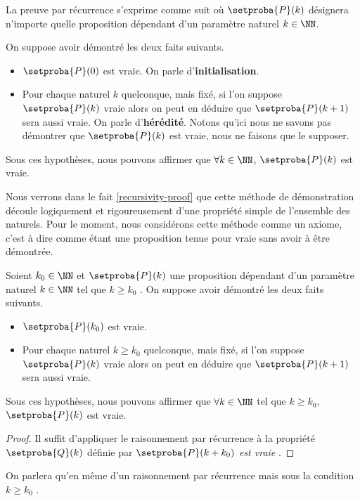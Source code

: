 \begin{fact} \label{recursivity}
	La preuve par récurrence s'exprime comme suit où $\setproba{P}(k)$ désignera n'importe quelle proposition dépendant d'un paramètre naturel $k \in \NN$.

	\medskip

	On suppose avoir démontré les deux faits suivants.
	
	\begin{itemize}[label=\small\textbullet]
		\item $\setproba{P}(0)$ est vraie. On parle d'\textbf{initialisation}.

		\item Pour chaque naturel $k$ quelconque, mais fixé, si l'on suppose $\setproba{P}(k)$ vraie alors on peut en déduire que $\setproba{P}(k+1)$ sera aussi vraie. On parle d'\textbf{hérédité}. Notons qu'ici nous ne savons pas démontrer que $\setproba{P}(k)$ est vraie, nous ne faisons que le supposer.
	\end{itemize}

	Sous ces hypothèses, nous pouvons affirmer que $\forall k \in \NN$, $\setproba{P}(k)$ est vraie.
\end{fact}


\begin{remark}
	Nous verrons dans le fait \ref{recursivity-proof} que cette méthode de démonstration découle logiquement et rigoureusement d'une propriété simple de l'ensemble des naturels.
	Pour le moment, nous considérons cette méthode comme un axiome, c'est à dire comme étant une proposition tenue pour vraie sans avoir à être démontrée.  
\end{remark}


\begin{fact}
	Soient $k_0 \in \NN$ et $\setproba{P}(k)$ une proposition dépendant d'un paramètre naturel $k \in \NN$ tel que $k \geq k_0$ .
	On suppose avoir démontré les deux faits suivants.
	
	\begin{itemize}[label=\small\textbullet]
		\item $\setproba{P}(k_0)$ est vraie.

		\item Pour chaque naturel $k \geq k_0$ quelconque, mais fixé, si l'on suppose $\setproba{P}(k)$ vraie alors on peut en déduire que $\setproba{P}(k+1)$ sera aussi vraie.
	\end{itemize}

	Sous ces hypothèses, nous pouvons affirmer que $\forall k \in \NN$ tel que $k \geq k_0$, $\setproba{P}(k)$ est vraie.
\end{fact}


\begin{proof}
	Il suffit d'appliquer le raisonnement par récurrence à la propriété $\setproba{Q}(k)$ définie par \emph{\og $\setproba{P}(k + k_0)$ est vraie \fg}.
\end{proof}


\begin{remark}
	On parlera qu'en même d'un raisonnement par récurrence mais sous la condition $k \geq k_0$ .  
\end{remark}


